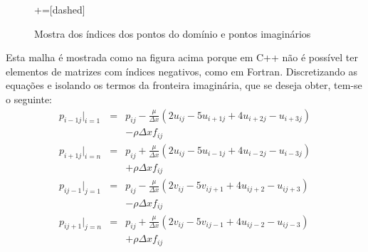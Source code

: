 \documentclass[journal]{IEEEtran}
\begin{document}
\begin{figure}
\centering
{}+=[dashed]%
\caption{Mostra dos índices dos pontos do domínio e pontos imaginários}
\end{figure}
Esta malha é mostrada como na figura acima porque em C++ não é possível ter elementos de matrizes com índices negativos, como em Fortran. Discretizando as equações e isolando os termos da fronteira imaginária, que se deseja obter, tem-se o seguinte:
\begin{eqnarray}
p_{i-1j}|_{i=1}&=&p_{ij}-\frac{\mu}{\Delta x}\left(2u_{ij}-5u_{i+1j}+4u_{i+2j}-u_{i+3j}\right)\nonumber\\ & & -\rho\Delta x f_{ij}\\
p_{i+1j}|_{i=n}&=&p_{ij}+\frac{\mu}{\Delta x}\left(2u_{ij}-5u_{i-1j}+4u_{i-2j}-u_{i-3j}\right)\nonumber\\ & &+\rho\Delta x f_{ij}\\
p_{ij-1}|_{j=1}&=&p_{ij}-\frac{\mu}{\Delta x}\left(2v_{ij}-5v_{ij+1}+4u_{ij+2}-u_{ij+3}\right)\nonumber\\& &-\rho\Delta x f_{ij}\\
p_{ij+1}|_{j=n}&=&p_{ij}+\frac{\mu}{\Delta x}\left(2v_{ij}-5v_{ij-1}+4u_{ij-2}-u_{ij-3}\right)\nonumber\\& &+\rho\Delta x f_{ij}
\end{eqnarray}
\end{document}
